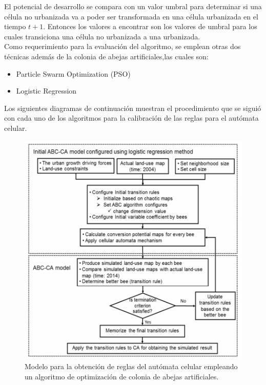 El potencial de desarrollo se compara con un valor umbral para determinar si una célula no urbanizada va a poder ser transformada en una célula urbanizada en el tiempo $t+1$. Entonces los valores a encontrar son los valores de umbral para los cuales transiciona una célula no urbanizada a una urbanizada.
\\
Como requerimiento para la evaluación del algoritmo, se emplean otras dos técnicas además de la colonia de abejas artificiales,las cuales son:
\begin{itemize}
	\item Particle Swarm Optimization (PSO)
	\item Logistic Regression
\end{itemize}

Los siguientes diagramas de continuación muestran el procedimiento que se siguió con cada uno de los algoritmos para la calibración de las reglas para el autómata celular.

\begin{figure}[H]
	\centering
	\includegraphics[width=\linewidth]{fig/abc}
	\caption{Modelo para la obtención de reglas del autómata celular empleando un algoritmo de optimización de colonia de abejas artificiales.}
	\label{fig:abc}
\end{figure}

